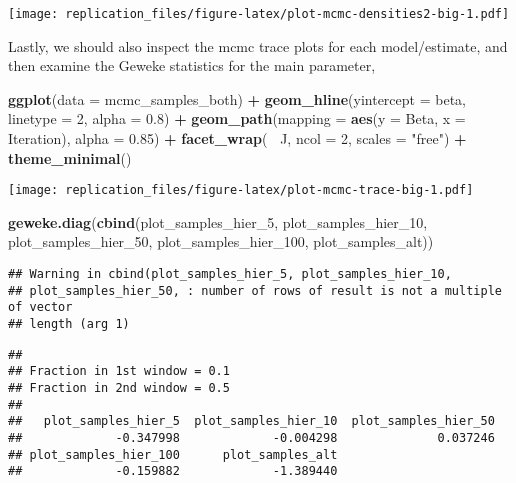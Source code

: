 \documentclass[]{article}
\newenvironment{Shaded}{\begin{snugshade}}{\end{snugshade}}
\newcommand{\KeywordTok}[1]{\textcolor[rgb]{0.13,0.29,0.53}{\textbf{#1}}}
\newcommand{\DataTypeTok}[1]{\textcolor[rgb]{0.13,0.29,0.53}{#1}}
\newcommand{\DecValTok}[1]{\textcolor[rgb]{0.00,0.00,0.81}{#1}}
\newcommand{\FloatTok}[1]{\textcolor[rgb]{0.00,0.00,0.81}{#1}}
\newcommand{\StringTok}[1]{\textcolor[rgb]{0.31,0.60,0.02}{#1}}
\newcommand{\OperatorTok}[1]{\textcolor[rgb]{0.81,0.36,0.00}{\textbf{#1}}}
\newcommand{\NormalTok}[1]{#1}
\begin{document}
\texttt{[image: replication\_files/figure-latex/plot-mcmc-densities2-big-1.pdf]}

Lastly, we should also inspect the mcmc trace plots for each
model/estimate, and then examine the Geweke statistics for the main
parameter,

\begin{Shaded}
\begin{Highlighting}[]
\KeywordTok{ggplot}\NormalTok{(}\DataTypeTok{data =}\NormalTok{ mcmc_samples_both) }\OperatorTok{+}
\StringTok{    }\KeywordTok{geom_hline}\NormalTok{(}\DataTypeTok{yintercept =}\NormalTok{ beta,}
                \DataTypeTok{linetype =} \DecValTok{2}\NormalTok{,}
                \DataTypeTok{alpha =} \FloatTok{0.8}\NormalTok{) }\OperatorTok{+}
\StringTok{    }\KeywordTok{geom_path}\NormalTok{(}\DataTypeTok{mapping =} \KeywordTok{aes}\NormalTok{(}\DataTypeTok{y =}\NormalTok{ Beta, }\DataTypeTok{x =}\NormalTok{ Iteration),}
                \DataTypeTok{alpha =} \FloatTok{0.85}\NormalTok{) }\OperatorTok{+}
\StringTok{    }\KeywordTok{facet_wrap}\NormalTok{(}\OperatorTok{~}\StringTok{ }\NormalTok{J, }\DataTypeTok{ncol =} \DecValTok{2}\NormalTok{, }\DataTypeTok{scales =} \StringTok{"free"}\NormalTok{) }\OperatorTok{+}
\StringTok{    }\KeywordTok{theme_minimal}\NormalTok{()}
\end{Highlighting}
\end{Shaded}

\texttt{[image: replication\_files/figure-latex/plot-mcmc-trace-big-1.pdf]}

\begin{Shaded}
\begin{Highlighting}[]
\KeywordTok{geweke.diag}\NormalTok{(}\KeywordTok{cbind}\NormalTok{(plot_samples_hier_}\DecValTok{5}\NormalTok{,}
\NormalTok{                plot_samples_hier_}\DecValTok{10}\NormalTok{,}
\NormalTok{                plot_samples_hier_}\DecValTok{50}\NormalTok{,}
\NormalTok{                plot_samples_hier_}\DecValTok{100}\NormalTok{,}
\NormalTok{                plot_samples_alt))}
\end{Highlighting}
\end{Shaded}

\begin{verbatim}
## Warning in cbind(plot_samples_hier_5, plot_samples_hier_10,
## plot_samples_hier_50, : number of rows of result is not a multiple of vector
## length (arg 1)
\end{verbatim}

\begin{verbatim}
## 
## Fraction in 1st window = 0.1
## Fraction in 2nd window = 0.5 
## 
##   plot_samples_hier_5  plot_samples_hier_10  plot_samples_hier_50 
##             -0.347998             -0.004298              0.037246 
## plot_samples_hier_100      plot_samples_alt 
##             -0.159882             -1.389440
\end{verbatim}
\end{document}
